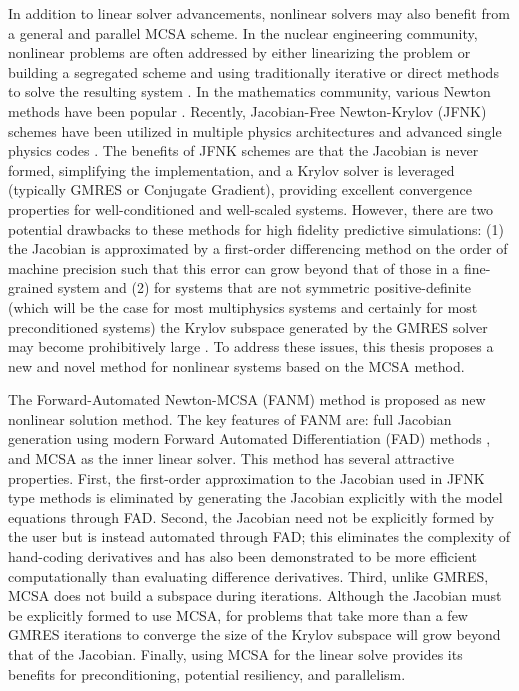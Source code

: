 In addition to linear solver advancements, nonlinear solvers may also
benefit from a general and parallel MCSA scheme. In the nuclear
engineering community, nonlinear problems are often addressed by
either linearizing the problem or building a segregated scheme and
using traditionally iterative or direct methods to solve the resulting
system \citep{pletcher_computational_1997}. In the mathematics
community, various Newton methods have been popular
\citep{kelley_iterative_1995}. Recently, Jacobian-Free Newton-Krylov
(JFNK) schemes \citep{knoll_jacobian-free_2004} have been utilized in
multiple physics architectures and advanced single physics codes
\citep{gaston_parallel_2009}. The benefits of JFNK schemes are that
the Jacobian is never formed, simplifying the implementation, and a
Krylov solver is leveraged (typically GMRES or Conjugate Gradient),
providing excellent convergence properties for well-conditioned and
well-scaled systems. However, there are two potential drawbacks to
these methods for high fidelity predictive simulations: (1) the
Jacobian is approximated by a first-order differencing method on the
order of machine precision such that this error can grow beyond that
of those in a fine-grained system \citep{kelley_iterative_1995} and
(2) for systems that are not symmetric positive-definite (which will
be the case for most multiphysics systems and certainly for most
preconditioned systems) the Krylov subspace generated by the GMRES
solver may become prohibitively large
\citep{knoll_newton-krylov_1995}. To address these issues, this thesis
proposes a new and novel method for nonlinear systems based on the
MCSA method.

The Forward-Automated Newton-MCSA (FANM) method is proposed as new
nonlinear solution method. The key features of FANM are: full Jacobian
generation using modern Forward Automated Differentiation (FAD)
methods \citep{bartlett_automatic_2006}, and MCSA as the inner linear
solver. This method has several attractive properties. First, the
first-order approximation to the Jacobian used in JFNK type methods is
eliminated by generating the Jacobian explicitly with the model
equations through FAD. Second, the Jacobian need not be explicitly
formed by the user but is instead automated through FAD; this
eliminates the complexity of hand-coding derivatives and has also been
demonstrated to be more efficient computationally than evaluating
difference derivatives. Third, unlike GMRES, MCSA does not build a
subspace during iterations. Although the Jacobian must be explicitly
formed to use MCSA, for problems that take more than a few GMRES
iterations to converge the size of the Krylov subspace will grow
beyond that of the Jacobian. Finally, using MCSA for the linear solve
provides its benefits for preconditioning, potential resiliency, and
parallelism.

